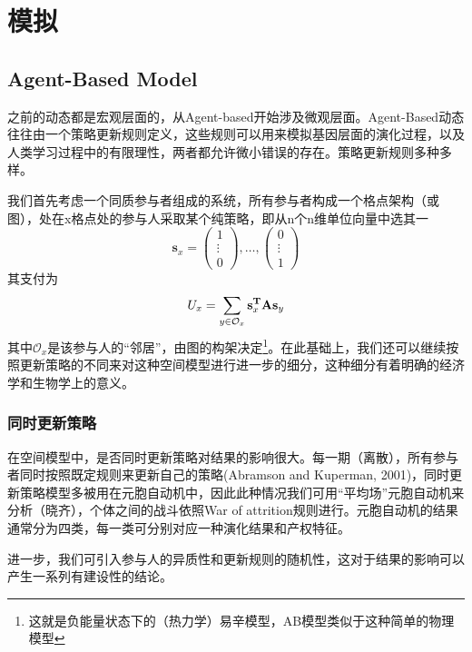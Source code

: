 \documentclass[lang=cn,12pt,a4paper]{elegantpaper}
\begin{document}
\section{模拟}

\subsection{Agent-Based Model}

之前的动态都是宏观层面的，从Agent-based开始涉及微观层面。Agent-Based动态往往由一个策略更新规则定义，这些规则可以用来模拟基因层面的演化过程，以及人类学习过程中的有限理性，两者都允许微小错误的存在。策略更新规则多种多样。

我们首先考虑一个同质参与者组成的系统，所有参与者构成一个格点架构（或图），处在x格点处的参与人采取某个纯策略，即从n个n维单位向量中选其一
\begin{equation}
\mathbf{s}_{x}=\left(\begin{array}{c}
1 \\
\vdots \\
0
\end{array}\right), \ldots,\left(\begin{array}{c}
0 \\
\vdots \\
1
\end{array}\right)
\end{equation}
其支付为
\begin{equation}
U_{x}=\sum_{y \in\mathcal{O}_{x}} \mathbf{s}_{x} ^{\bf{T}} \mathbf{A} \mathbf{s}_{y}
\end{equation}
其中$\mathcal{O}_x$是该参与人的“邻居”，由图的构架决定\footnote{这就是负能量状态下的（热力学）易辛模型，AB模型类似于这种简单的物理模型}。在此基础上，我们还可以继续按照更新策略的不同来对这种空间模型进行进一步的细分，这种细分有着明确的经济学和生物学上的意义。

\subsubsection{同时更新策略}

在空间模型中，是否同时更新策略对结果的影响很大。每一期（离散），所有参与者同时按照既定规则来更新自己的策略(Abramson and Kuperman, 2001)，同时更新策略模型多被用在元胞自动机中，因此此种情况我们可用“平均场”元胞自动机来分析（晓齐），个体之间的战斗依照War of attrition规则进行。元胞自动机的结果通常分为四类，每一类可分别对应一种演化结果和产权特征。

进一步，我们可引入参与人的异质性和更新规则的随机性，这对于结果的影响可以产生一系列有建设性的结论。
\end{document}
